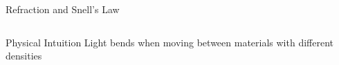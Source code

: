 \begin{frame}{Refraction and Snell's Law}
\begin{columns}
\begin{column}{0.5\textwidth}
        \end{column}
    \end{columns}
    
    \begin{conceptbox}{Physical Intuition}
        Light bends when moving between materials with different densities
    \end{conceptbox}
\end{frame}

